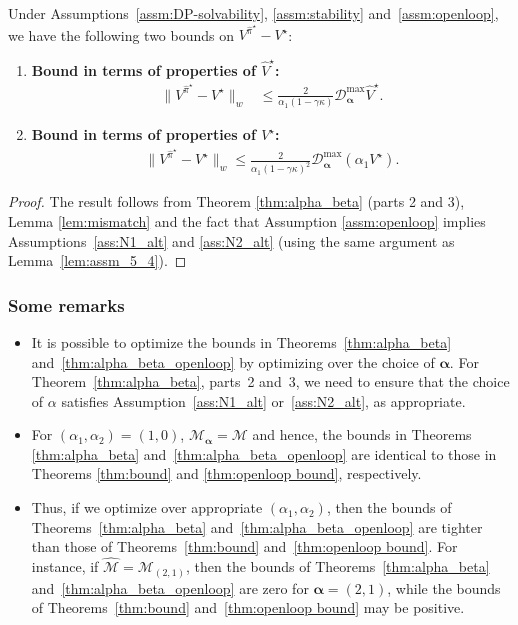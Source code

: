 \documentclass[letterpaper, 10pt]{IEEEtran}
\newcommand*\ALPHABET{\mathcal}
\newcommand*\MISMATCH{\mathscr{D}}
\newcommand*\scale{(\alpha_1,\alpha_2)}
\begin{document}
\begin{theorem}\label{thm:alpha_beta_openloop}
   Under Assumptions~\ref{assm:DP-solvability}, \ref{assm:stability} and~\ref{assm:openloop}, we have the following two bounds on $V^{\hat \pi^\star} - V^\star$:
   \begin{enumerate}
       \item \textbf{Bound in terms of properties of $\hat V^\star$:}
       \begin{align*}
          \bigl\| V^{\hat \pi^\star} - V^\star \bigr\|_w
             &\le \frac{2}{\alpha_1(1-\gamma\kappa)} \MISMATCH_{\boldsymbol{\alpha}}^{\max}\hat V^\star.
       \end{align*}
       \item \textbf{Bound in terms of properties of $V^\star$:}
       \begin{align*}
          \bigl\| V^{\hat \pi^\star} - V^\star \bigr\|_w
              \leq \frac{2}{\alpha_1(1-\gamma\kappa)^2} \MISMATCH_{\boldsymbol{\alpha}}^{\max}(\alpha_1 V^\star).
       \end{align*}
   \end{enumerate}
\end{theorem}

\begin{proof}The result follows from Theorem \ref{thm:alpha_beta} (parts 2 and 3), Lemma \ref{lem:mismatch} and the fact that Assumption \ref{assm:openloop} implies Assumptions~\ref{ass:N1_alt} and \ref{ass:N2_alt} (using the same argument as Lemma~\ref{lem:assm_5_4}).
\end{proof}

\subsubsection*{Some remarks}
\begin{itemize}
    \item It is possible to optimize the bounds in Theorems~\ref{thm:alpha_beta} and~\ref{thm:alpha_beta_openloop} by optimizing over the choice of $\boldsymbol{\alpha}$. For Theorem~\ref{thm:alpha_beta}, parts~2 and~3, we need to ensure that the choice of $\alpha$ satisfies Assumption~\ref{ass:N1_alt} or~\ref{ass:N2_alt}, as appropriate.

    \item 
For $\scale=(1,0)$, $\ALPHABET M_{\boldsymbol{\alpha}} = \ALPHABET M$ and hence, the bounds in Theorems \ref{thm:alpha_beta} and~\ref{thm:alpha_beta_openloop} are identical to those in Theorems \ref{thm:bound} and \ref{thm:openloop bound}, respectively.
    \item Thus, if we optimize over appropriate $(\alpha_1, \alpha_2)$, then the bounds of Theorems~\ref{thm:alpha_beta} and~\ref{thm:alpha_beta_openloop} are tighter than those of Theorems~\ref{thm:bound} and~\ref{thm:openloop bound}. For instance, if $\hat {\ALPHABET M} = \ALPHABET M_{(2,1)}$, then the bounds of Theorems~\ref{thm:alpha_beta} and~\ref{thm:alpha_beta_openloop} are zero for $\boldsymbol{\alpha} = (2,1)$, while the bounds of Theorems~\ref{thm:bound} and~\ref{thm:openloop bound} may be positive.
\end{itemize}
\end{document}
